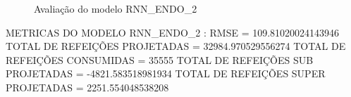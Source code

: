 \documentclass[	12pt, Times, openright, twoside, a4paper, english, brazil]{abntex2}
\begin{document}
                \begin{figure}[!ht]
                  \caption{Avaliação do modelo RNN\_ENDO\_2 \label{fig:case1_rnn_endo2_val} }
                \end{figure}
                METRICAS DO MODELO RNN\_ENDO\_2 : \newline
                RMSE = 109.81020024143946\newline
                TOTAL DE REFEIÇÕES PROJETADAS = 32984.970529556274\newline
                TOTAL DE REFEIÇÕES CONSUMIDAS = 35555\newline
                TOTAL DE REFEIÇÕES SUB PROJETADAS = -4821.583518981934\newline
                TOTAL DE REFEIÇÕES SUPER PROJETADAS = 2251.554048538208\newline
\end{document}
